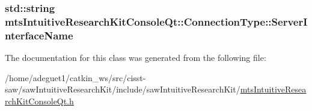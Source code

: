 \hypertarget{classmts_intuitive_research_kit_console_qt_1_1_connection_type_af86c8637107c8f695e93f4d0548b61fb}{
\subsubsection[{Server\-Interface\-Name}]{\setlength{\rightskip}{0pt plus 5cm}std\-::string mts\-Intuitive\-Research\-Kit\-Console\-Qt\-::\-Connection\-Type\-::\-Server\-Interface\-Name}}\label{classmts_intuitive_research_kit_console_qt_1_1_connection_type_af86c8637107c8f695e93f4d0548b61fb}


The documentation for this class was generated from the following file\-:\begin{DoxyCompactItemize}
\item 
/home/adeguet1/catkin\-\_\-ws/src/cisst-\/saw/saw\-Intuitive\-Research\-Kit/include/saw\-Intuitive\-Research\-Kit/\hyperlink{mts_intuitive_research_kit_console_qt_8h}{mts\-Intuitive\-Research\-Kit\-Console\-Qt.\-h}\end{DoxyCompactItemize}
